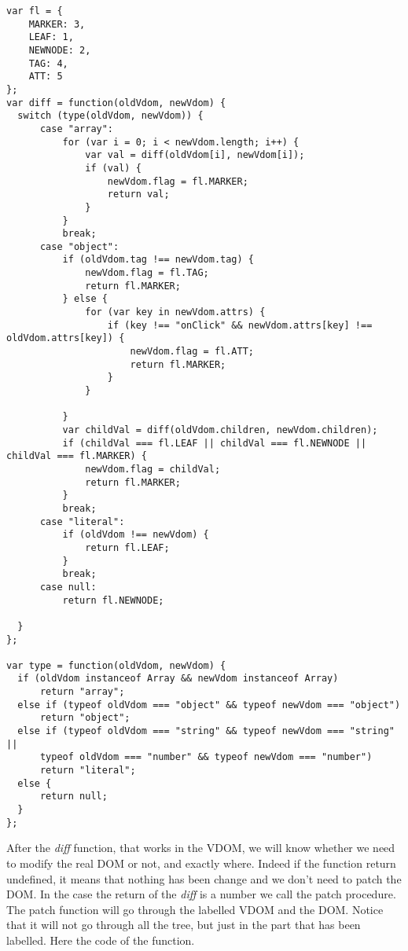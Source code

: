 \documentclass[10pt]{article}
\begin{document}
\begin{lstlisting}[caption=\textit{diff} function]
var fl = {
    MARKER: 3,
    LEAF: 1,
    NEWNODE: 2,
    TAG: 4,
    ATT: 5
};
var diff = function(oldVdom, newVdom) {
  switch (type(oldVdom, newVdom)) {
      case "array":
          for (var i = 0; i < newVdom.length; i++) {
              var val = diff(oldVdom[i], newVdom[i]);
              if (val) {
                  newVdom.flag = fl.MARKER;
                  return val;
              }
          }
          break;
      case "object":
          if (oldVdom.tag !== newVdom.tag) {
              newVdom.flag = fl.TAG;
              return fl.MARKER;
          } else {
              for (var key in newVdom.attrs) {
                  if (key !== "onClick" && newVdom.attrs[key] !== oldVdom.attrs[key]) {
                      newVdom.flag = fl.ATT;
                      return fl.MARKER;
                  }
              }

          }
          var childVal = diff(oldVdom.children, newVdom.children);
          if (childVal === fl.LEAF || childVal === fl.NEWNODE || childVal === fl.MARKER) {
              newVdom.flag = childVal;
              return fl.MARKER;
          }
          break;
      case "literal":
          if (oldVdom !== newVdom) {
              return fl.LEAF;
          }
          break;
      case null:
          return fl.NEWNODE;

  }
};

var type = function(oldVdom, newVdom) {
  if (oldVdom instanceof Array && newVdom instanceof Array)
      return "array";
  else if (typeof oldVdom === "object" && typeof newVdom === "object")
      return "object";
  else if (typeof oldVdom === "string" && typeof newVdom === "string" ||
      typeof oldVdom === "number" && typeof newVdom === "number")
      return "literal";
  else {
      return null;
  }
};
\end{lstlisting}
After the \textit{diff} function, that works in the VDOM, we will know whether we need to modify the real DOM or not, and exactly where. Indeed if the function return undefined, it means that nothing has been change and we don't need to patch the DOM. In the case the return of the \textit{diff} is a number we call the patch procedure. The patch function will go through the labelled VDOM and the DOM. Notice that it will not go through all the tree, but just in the part that has been labelled. Here the code of the function.   
\end{document}
